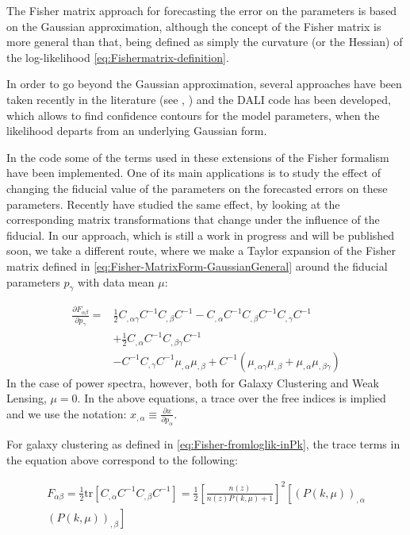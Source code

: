 The Fisher matrix approach for forecasting the error on the parameters is based on the Gaussian approximation, although the concept
of the Fisher matrix is more general than that, being defined as simply the curvature (or the Hessian) of the log-likelihood \cref{eq:Fishermatrix-definition}.

In order to go beyond the Gaussian approximation, several approaches have been taken recently in the literature (see \cite{sellentin_breaking_2014}, 
\cite{cite more sellentin}) and the \textsc{DALI} code \cite{cite more sellentin, link github} has been developed, which allows
to find confidence contours for the model parameters, when the likelihood departs from an underlying Gaussian form.

In the \fito code some of the terms used in these extensions of the Fisher formalism have been implemented. One of its main applications is to study
the effect of changing the fiducial value of the parameters on the forecasted errors on these parameters. Recently \cite{bjoern and reischke}
have studied the same effect, by looking at the corresponding matrix transformations that change under the influence of the fiducial.
In our approach, which is still a work in progress and will be published soon,
we take a different route, where we make a Taylor expansion of the Fisher matrix defined in \cref{eq:Fisher-MatrixForm-GaussianGeneral} 
around the fiducial parameters $p_{\gamma}$ with data mean $\mu$:

\begin{align}
\frac{\partial F_{\alpha\beta}}{\partial p_{\gamma}}  = & \frac{1}{2}C_{,\alpha\gamma}C^{-1}C_{,\beta}C^{-1}
-C_{,\alpha}C^{-1}C_{,\beta}C^{-1}C_{,\gamma}C^{-1} \nonumber\\
& +\frac{1}{2}C_{,\alpha}C^{-1}C_{,\beta\gamma}C^{-1}\\
& -C^{-1}C_{,\gamma}C^{-1}\mu_{,\alpha}\mu_{,\beta}+C^{-1}(\mu_{,\alpha\gamma}\mu_{,\beta}+\mu_{,\alpha}\mu_{,\beta\gamma})\nonumber 
\end{align}
In the case of power spectra, however, both for Galaxy Clustering and Weak Lensing,
$\mu=0$. In the above equations, a trace over the free indices is
implied and we use the notation: $x_{,\alpha} \equiv\frac{\partial x}{\partial p_{\alpha}}$.

For galaxy clustering as defined in \cref{eq:Fisher-fromloglik-inPk}, the trace terms in the equation above correspond to
the following:

\begin{multline}
F_{\alpha\beta}=\frac{1}{2}\mbox{tr}\left[C_{,\alpha}C^{-1}C_{,\beta}C^{-1}\right]=\frac{1}{2}\left[\frac{n(z)}{n(z)P(k,\mu)+1}\right]^{2}\left[\left(P(k,\mu)\right)_{,\alpha}\right.\\
\left.\left(P(k,\mu)\right)_{,\beta}\right]
\end{multline}


